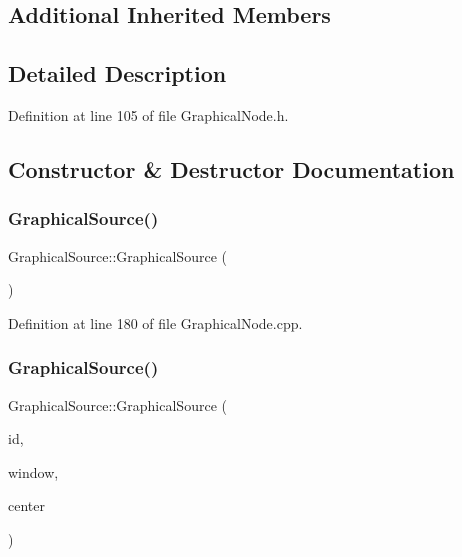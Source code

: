 \subsection*{Additional Inherited Members}


\subsection{Detailed Description}


Definition at line 105 of file Graphical\+Node.\+h.



\subsection{Constructor \& Destructor Documentation}
\mbox{\label{class_graphical_source_ad798712e86d821da957bbb7864d76c5a}} 
\subsubsection{\texorpdfstring{Graphical\+Source()}{GraphicalSource()}\hspace{0.1cm}{\footnotesize\ttfamily [1/2]}}
{\footnotesize\ttfamily Graphical\+Source\+::\+Graphical\+Source (\begin{DoxyParamCaption}{ }\end{DoxyParamCaption})}



Definition at line 180 of file Graphical\+Node.\+cpp.

\mbox{\label{class_graphical_source_ad557a50f4519460a53e8f7b6f4b21f5b}} 
\subsubsection{\texorpdfstring{Graphical\+Source()}{GraphicalSource()}\hspace{0.1cm}{\footnotesize\ttfamily [2/2]}}
{\footnotesize\ttfamily Graphical\+Source\+::\+Graphical\+Source (\begin{DoxyParamCaption}\item[{\hyperlink{_graphical_element_8h_ade5fd6c85839a416577ff9de1605141e}{Element\+Key}}]{id,  }\item[{wx\+Window $\ast$}]{window,  }\item[{wx\+Point2\+D\+Double}]{center }\end{DoxyParamCaption})}



